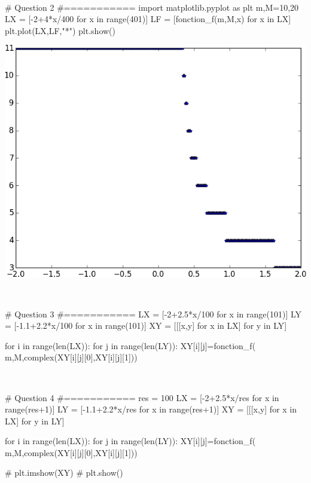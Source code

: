 \documentclass[10pt,fleqn]{article} %
\begin{document}
\begin{multicols}{2}
\begin{corrige}
$\quad$
\begin{python}
# Question 2
#===========
import matplotlib.pyplot as plt
m,M=10,20
LX = [-2+4*x/400 for x in range(401)]
LF = [fonction_f(m,M,x) for x in LX]
plt.plot(LX,LF,"*")
plt.show()
\end{python}
\end{corrige}
\begin{center}
\includegraphics[width=.8\linewidth]{programmes/Exercice_09/figure_1}
\end{center}
\begin{corrige}
$\quad$
\begin{python}
# Question 3
#===========
LX = [-2+2.5*x/100 for x in range(101)]
LY = [-1.1+2.2*x/100 for x in range(101)]
XY = [[[x,y] for x in LX] for y in LY]

for i in range(len(LX)):
    for j in range(len(LY)):
        XY[i][j]=fonction_f(
            m,M,complex(XY[i][j][0],XY[i][j][1]))
\end{python}
\end{corrige}

\begin{corrige}
$\quad$
\begin{python}

# Question 4
#===========
res = 100
LX = [-2+2.5*x/res for x in range(res+1)]
LY = [-1.1+2.2*x/res for x in range(res+1)]
XY = [[[x,y] for x in LX] for y in LY]

for i in range(len(LX)):
    for j in range(len(LY)):
        XY[i][j]=fonction_f(
        m,M,complex(XY[i][j][0],XY[i][j][1]))

# plt.imshow(XY)
# plt.show()
\end{python}
\end{corrige}


\end{multicols}
\end{document}
